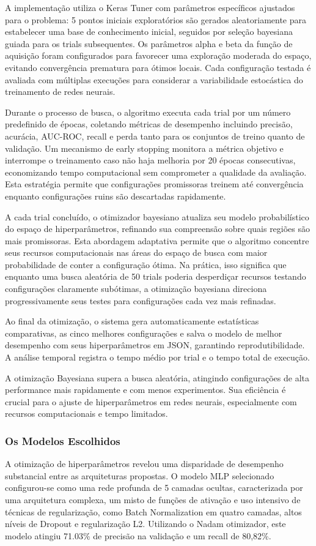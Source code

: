 A implementação utiliza o Keras Tuner com parâmetros específicos ajustados para o problema: 5 pontos iniciais exploratórios são gerados aleatoriamente para estabelecer uma base de conhecimento inicial, seguidos por seleção bayesiana guiada para os trials subsequentes. Os parâmetros alpha e beta da função de aquisição foram configurados para favorecer uma exploração moderada do espaço, evitando convergência prematura para ótimos locais. Cada configuração testada é avaliada com múltiplas execuções para considerar a variabilidade estocástica do treinamento de redes neurais.

Durante o processo de busca, o algoritmo executa cada trial por um número predefinido de épocas, coletando métricas de desempenho incluindo precisão, acurácia, AUC-ROC, recall e perda tanto para os conjuntos de treino quanto de validação. Um mecanismo de early stopping monitora a métrica objetivo e interrompe o treinamento caso não haja melhoria por 20 épocas consecutivas, economizando tempo computacional sem comprometer a qualidade da avaliação. Esta estratégia permite que configurações promissoras treinem até convergência enquanto configurações ruins são descartadas rapidamente.

A cada trial concluído, o otimizador bayesiano atualiza seu modelo probabilístico do espaço de hiperparâmetros, refinando sua compreensão sobre quais regiões são mais promissoras. Esta abordagem adaptativa permite que o algoritmo concentre seus recursos computacionais nas áreas do espaço de busca com maior probabilidade de conter a configuração ótima. Na prática, isso significa que enquanto uma busca aleatória de 50 trials poderia desperdiçar recursos testando configurações claramente subótimas, a otimização bayesiana direciona progressivamente seus testes para configurações cada vez mais refinadas.

Ao final da otimização, o sistema gera automaticamente estatísticas comparativas, as cinco melhores configurações e salva o modelo de melhor desempenho com seus hiperparâmetros em JSON, garantindo reprodutibilidade. A análise temporal registra o tempo médio por trial e o tempo total de execução.

A otimização Bayesiana supera a busca aleatória, atingindo configurações de alta performance mais rapidamente e com menos experimentos. Sua eficiência é crucial para o ajuste de hiperparâmetros em redes neurais, especialmente com recursos computacionais e tempo limitados.

\subsubsection{Os Modelos Escolhidos}
A otimização de hiperparâmetros revelou uma disparidade de desempenho substancial entre as arquiteturas propostas. O modelo MLP selecionado configurou-se como uma rede profunda de 5 camadas ocultas, caracterizada por uma arquitetura complexa, um misto de funções de ativação e uso intensivo de técnicas de regularização, como Batch Normalization em quatro camadas, altos níveis de Dropout e regularização L2. Utilizando o Nadam otimizador, este modelo atingiu 71.03\% de precisão na validação e um recall de 80,82\%.

